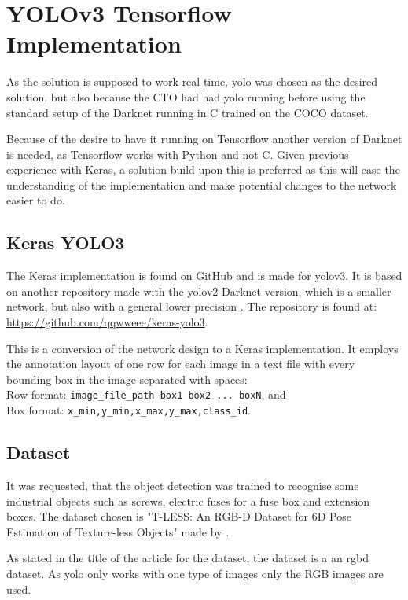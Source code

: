 \section{YOLOv3 Tensorflow Implementation}\label{sec:yolo_tens}
As the solution is supposed to work real time, \gls{yolo} was chosen as the desired solution, but also because the CTO had had \gls{yolo} running before using the standard setup of the Darknet running in C trained on the COCO dataset.

Because of the desire to have it running on Tensorflow another version of Darknet is needed, as Tensorflow works with Python and not C. 
Given previous experience with Keras, a solution build upon this is preferred as this will ease the understanding of the implementation and make potential changes to the network easier to do.

\subsection{Keras YOLO3}\label{sec:kerasyolo}
The Keras implementation is found on GitHub and is made for \gls{yolo}v3. It is based on another repository made with the \gls{yolo}v2 Darknet version, which is a smaller network, but also with a general lower precision \citep{Redmon2016, Redmon2018}. The repository is found at: \url{https://github.com/qqwweee/keras-yolo3}.

This is a conversion of the network design to a Keras implementation. It employs the annotation layout of one row for each image in a text file with every bounding box in the image separated with spaces:\\

\noindent Row format: \lstinline{image_file_path box1 box2 ... boxN}, and\\ Box format: \lstinline{x_min,y_min,x_max,y_max,class_id}.

\subsection{Dataset}
It was requested, that the object detection was trained to recognise some industrial objects such as screws, electric fuses for a fuse box and extension boxes. The dataset chosen is "T-LESS: An RGB-D Dataset for 6D Pose Estimation of Texture-less Objects" made by \cite{tless}. 

As stated in the title of the article for the dataset, the dataset is a an \gls{rgbd} dataset. As \gls{yolo} only works with one type of images only the RGB images are used.

